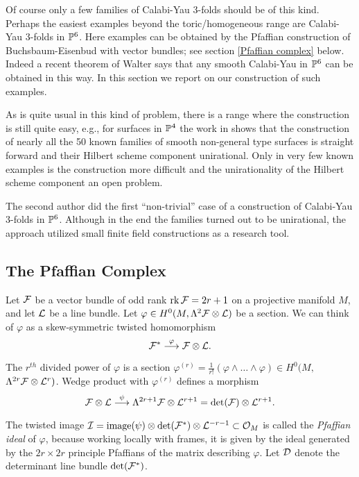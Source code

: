 Of course only a few families of Calabi-Yau 3-folds should be of this kind.
Perhaps the easiest examples beyond the toric/homogeneous range are 
Ca\-la\-bi-Yau 3-folds in ${\mathbb P}^6$. 
Here examples can be obtained by the Pfaffian
construction of Buchsbaum-Eisenbud \cite{CO:BE} with vector bundles; see 
section \ref{Pfaffian complex} below. 
Indeed a recent theorem of Walter \cite{CO:Wa} says 
that any smooth Calabi-Yau in ${\mathbb P}^6$ can be obtained in this way. 
In this section we report on our construction of such examples. 

As is quite usual in this kind of problem, there is a range where the
construction is still quite easy, 
e.g., for surfaces in ${\mathbb P}^4$ the work in \cite{CO:DES,CO:Po} 
shows that the construction of nearly all the 50 known families 
of smooth non-general type surfaces is straight forward 
and their Hilbert scheme component unirational. 
Only in very few known examples is the construction more difficult
and the unirationality of the Hilbert scheme component an open problem.

The second author did the first ``non-trivial'' case of a construction of 
Calabi-Yau 3-folds in ${\mathbb P}^6$. 
Although in the end the families  turned out to be unirational, 
the approach utilized small finite field constructions as a research tool.




\subsection{The Pfaffian Complex}
Let ${\mathcal F}$ be a vector bundle of odd rank $\operatorname{rk} {\mathcal F} = 2r+1$ on a projective
manifold $M$, and let ${\mathcal L}$ be a line bundle. Let $\varphi 
\in H^0(M,\Lambda^2 {\mathcal F} \otimes {\mathcal L})$ be a section. We can 
think of $\varphi$ as a skew-symmetric twisted homomorphism
$${\mathcal F}^* \stackrel{\varphi}{\longrightarrow} {\mathcal F} \otimes {\mathcal L}.$$
 
The $r^{th}$ divided power of $\varphi$ is a section
$\varphi^{(r)} = \frac{1}{r!}(\varphi \wedge \dots \wedge \varphi) \in 
H^0(M,$ $\Lambda^{2r}{\mathcal F} \otimes {\mathcal L}^r)$.  Wedge product with $\varphi^{(r)}$ 
defines a morphism 
$$ {\mathcal F} \otimes {\mathcal L} \stackrel{\psi}{\longrightarrow}  \Lambda^{2r+1} {\mathcal F} \otimes {\mathcal L}^{r+1}=\operatorname{det}({\mathcal F})\otimes{\mathcal L}^{r+1}.$$

The  twisted image 
${\mathcal I} = {\rm{image}}(\psi) \otimes \operatorname{det}({\mathcal F}^*) \otimes {\mathcal L}^{-r-1} \subset {\mathcal O}_M$
is called the {\sl Pfaffian ideal} of $\varphi$, because working locally
with frames, it is given by the ideal generated by the  $2r\times 2r$ principle
Pfaffians of the matrix describing $\varphi$.
Let ${\mathcal D}$ denote the determinant line bundle $\operatorname{det}({\mathcal F}^*)$.

